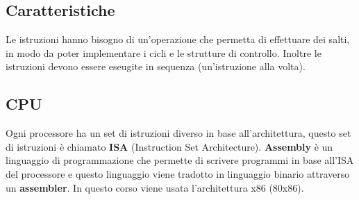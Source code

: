 \documentclass[a4paper]{article}
\theoremstyle{break}
\theoremstyle{break}
\theoremstyle{break}
\theoremstyle{break}
\begin{document}
\subsection{Caratteristiche}
Le istruzioni hanno bisogno di un'operazione che permetta di effettuare dei salti,
in modo da poter implementare i cicli e le strutture di controllo. Inoltre le istruzioni
devono essere eseugite in sequenza (un'istruzione alla volta).

\subsection{CPU}
Ogni processore ha un set di istruzioni diverso in base all'architettura,
questo set di istruzioni è chiamato \textbf{ISA} (Instruction Set Architecture).
\textbf{Assembly} è un linguaggio di programmazione che permette di scrivere programmi
in base all'ISA del processore e questo linguaggio viene tradotto in linguaggio binario
attraverso un \textbf{assembler}. In questo corso viene usata l'architettura x86 (80x86).
\end{document}
